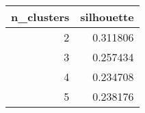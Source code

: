 \begin{tabular}{rr}
\toprule
 n\_clusters &  silhouette \\
\midrule
          2 &    0.311806 \\
          3 &    0.257434 \\
          4 &    0.234708 \\
          5 &    0.238176 \\
\bottomrule
\end{tabular}
